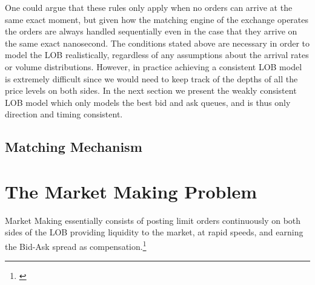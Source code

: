 \documentclass[12pt,a4paper]{cau_thesis}
\begin{document}
One could argue that these rules only apply when no orders can arrive at the same exact moment, but given how the matching engine of the exchange operates the orders are always handled sequentially even in the case that they arrive on the same exact nanosecond. The conditions stated above are necessary in order to model the LOB realistically, regardless of any assumptions about the arrival rates or volume distributions. However, in practice achieving a consistent LOB model is extremely difficult since we would need to keep track of the depths of all the price levels on both sides. In the next section we present the weakly consistent LOB model which only models the best bid and ask queues, and is thus only direction and timing consistent.

\subsection{Matching Mechanism}\label{sub_sec:matching_mechanism}
\section{The Market Making Problem}\label{sec:market_making_problem}
Market Making essentially consists of posting limit orders
continuously on both sides of the LOB providing liquidity to the
market, at rapid speeds, and earning the Bid-Ask spread as
compensation.\footnote{\cite[See ][, p.1; ]{jain2025impulse}
    \cite[See ][, p.9 and 20 and also the important specification of MM
        and Liquidity Privision.]{cartea2015algorithmic}}
\end{document}
